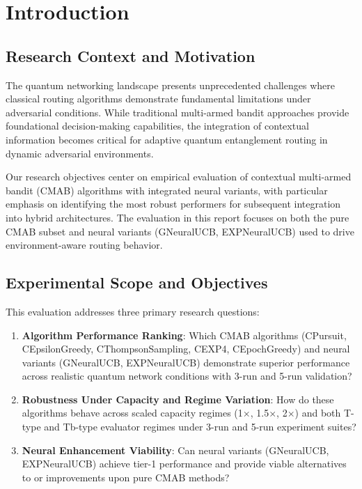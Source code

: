 \documentclass[12pt,a4paper]{article}
\begin{document}
\newpage
\section{Introduction}

\subsection{Research Context and Motivation}

The quantum networking landscape presents unprecedented challenges where classical routing algorithms demonstrate fundamental limitations under adversarial conditions. While traditional multi-armed bandit approaches provide foundational decision-making capabilities, the integration of contextual information becomes critical for adaptive quantum entanglement routing in dynamic adversarial environments.

Our research objectives center on empirical evaluation of contextual multi-armed bandit (CMAB) algorithms with integrated neural variants, with particular emphasis on identifying the most robust performers for subsequent integration into hybrid architectures. The evaluation in this report focuses on both the pure CMAB subset and neural variants (GNeuralUCB, EXPNeuralUCB) used to drive environment-aware routing behavior.

\subsection{Experimental Scope and Objectives}

This evaluation addresses three primary research questions:

\begin{enumerate}
\item \textbf{Algorithm Performance Ranking}: Which CMAB algorithms (CPursuit, CEpsilonGreedy, CThompsonSampling, CEXP4, CEpochGreedy) and neural variants (GNeuralUCB, EXPNeuralUCB) demonstrate superior performance across realistic quantum network conditions with 3-run and 5-run validation?
\item \textbf{Robustness Under Capacity and Regime Variation}: How do these algorithms behave across scaled capacity regimes (1$\times$, 1.5$\times$, 2$\times$) and both T-type and Tb-type evaluator regimes under 3-run and 5-run experiment suites?
\item \textbf{Neural Enhancement Viability}: Can neural variants (GNeuralUCB, EXPNeuralUCB) achieve tier-1 performance and provide viable alternatives to or improvements upon pure CMAB methods?
\end{enumerate}
\end{document}
